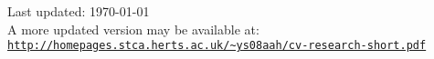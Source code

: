\documentclass[a4paper]{article}
\def\footerlink{http://homepages.stca.herts.ac.uk/\textasciitilde{}ys08aah/cv-research-short.pdf}
\begin{document}




\begin{center}
  \begin{footnotesize}
    Last updated: \today\\A more updated version may be available at: \\
    \href{\footerlink}{\texttt{\footerlink}}
  \end{footnotesize}
\end{center}
\end{document}
